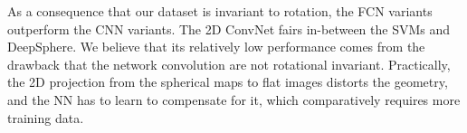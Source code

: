 \documentclass{article} %
\newcommand{\secref}[1]{Section~\ref{sec:#1}}
\newcommand{\1}{\b{1}}              %
\newcommand{\0}{\b{0}}              %
\begin{document}
As a consequence that our dataset is invariant to rotation, the FCN variants outperform the CNN variants.
The 2D ConvNet fairs in-between the SVMs and DeepSphere.
We believe that its relatively low performance comes from the drawback that the network convolution are not rotational invariant.
Practically, the 2D projection from the spherical maps to flat images distorts the geometry, and the NN has to learn to compensate for it, which comparatively requires more training data.


\end{document}
